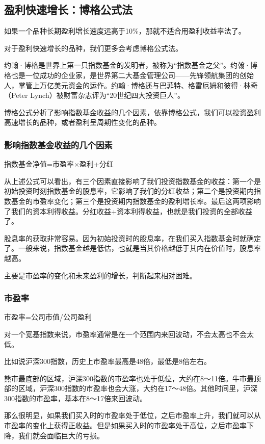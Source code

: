 \subsection{盈利快速增长：博格公式法}
如果一个品种长期盈利增长速度远高于10\%，那就不适合用盈利收益率法了。

对于盈利快速增长的品种，我们更多会考虑博格公式法。

约翰·博格是世界上第一只指数基金的发明者，被称为“指数基金之父”。约翰·博格也是一位成功的企业家，是世界第二大基金管理公司——先锋领航集团的创始人，掌管上万亿美元资金的运作。约翰·博格还与巴菲特、格雷厄姆和彼得·林奇（Peter Lynch）被财富杂志评为“20世纪四大投资巨人”。

博格公式分析了影响指数基金收益的几个因素，依靠博格公式，我们可以投资盈利高速增长的品种，或者盈利呈周期性变化的品种。

\subsubsection{影响指数基金收益的几个因素}

{\kaishu 指数基金净值=市盈率×盈利+分红}

从上述公式可以看出，有三个因素直接影响了我们投资指数基金的收益：第一个是初始投资时刻指数基金的股息率，它影响了我们的分红收益；第二个是投资期内指数基金的市盈率变化；第三个是投资期内指数基金的盈利增长率。最后这两项影响了我们的资本利得收益。分红收益+资本利得收益，也就是我们投资的全部收益了。

股息率的获取非常容易。因为初始投资时的股息率，在我们买入指数基金时就确定了。一般来说，指数基金越是低估，也就是当其价格越低于其内在价值时，股息率越高。

主要是市盈率的变化和未来盈利的增长，判断起来相对困难。

\subsubsection{市盈率}

{\kaishu 市盈率=公司市值/公司盈利}

对一个宽基指数来说，市盈率通常是在一个范围内来回波动，不会太高也不会太低。

比如说沪深300指数，历史上市盈率最高是48倍，最低是8倍左右。

熊市最底部的区域，沪深300指数的市盈率也处于低位，大约在8～11倍。牛市最顶部的区域，沪深300指数的市盈率也会大涨，大约在17～48倍。其他时间里，沪深300指数的市盈率，基本在8～17倍来回波动。

那么很明显，如果我们买入时的市盈率处于低位，之后市盈率上升，我们就可以从市盈率的变化上获得正收益。但是如果买入时的市盈率处于高位，之后市盈率下降，我们就会面临巨大的亏损。

